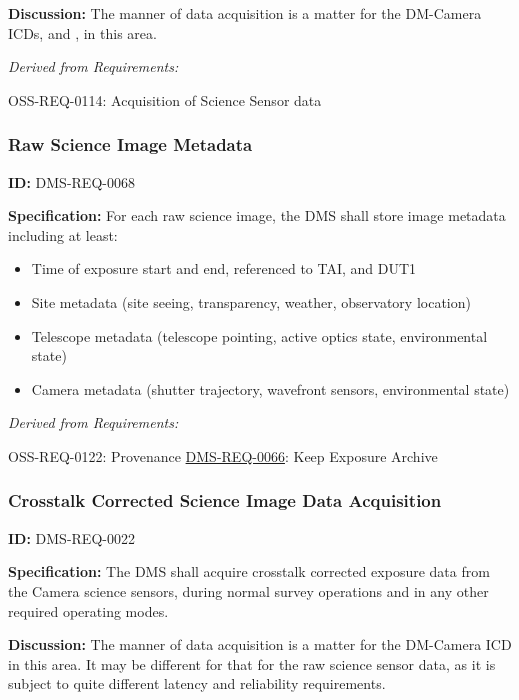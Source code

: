\documentclass[SE,toc,lsstdraft]{lsstdoc}
\begin{document}
\textbf{Discussion:} The manner of data acquisition is a matter for the DM-Camera ICDs,  and , in this area.




\emph{Derived from Requirements:}

OSS-REQ-0114:
Acquisition of Science Sensor data \newline


\subsubsection{Raw Science Image Metadata}

\label{DMS-REQ-0068}
\textbf{ID:} DMS-REQ-0068

\textbf{Specification:} For each raw science image, the DMS shall store image metadata including at least:
\begin{itemize}
\item Time of exposure start and end, referenced to TAI, and DUT1
\item Site metadata (site seeing, transparency, weather, observatory location)
\item Telescope metadata (telescope pointing, active optics state, environmental state)
\item Camera metadata (shutter trajectory, wavefront sensors, environmental state)
\end{itemize}






\emph{Derived from Requirements:}

OSS-REQ-0122:
Provenance \newline
\hyperref[DMS-REQ-0066]{DMS-REQ-0066}:
Keep Exposure Archive \newline


\subsubsection{Crosstalk Corrected Science Image Data Acquisition}

\label{DMS-REQ-0022}
\textbf{ID:} DMS-REQ-0022

\textbf{Specification:} The DMS shall acquire crosstalk corrected exposure data from the Camera science sensors, during normal survey operations and in any other required operating modes.

\textbf{Discussion:} The manner of data acquisition is a matter for the DM-Camera ICD in this area.  It may be different for that for the raw science sensor data, as it is subject to quite different latency and reliability requirements.
\end{document}
